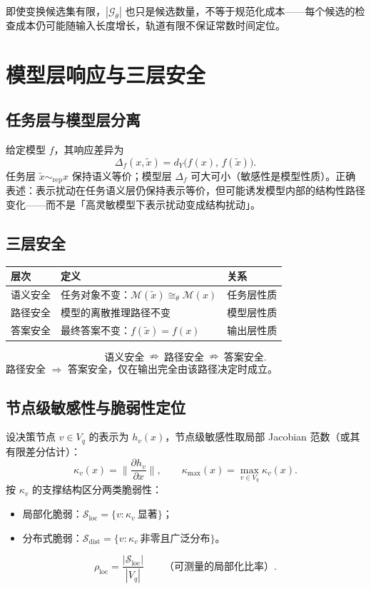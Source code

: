 \documentclass[11pt]{ctexart}
\begin{document}
即使变换候选集有限，$|\mathcal{G}_{\theta}|$ 也只是候选数量，不等于规范化成本——每个候选的检查成本仍可能随输入长度增长，轨道有限不保证常数时间定位。

\section{模型层响应与三层安全}

\subsection{任务层与模型层分离}

给定模型 $f$，其响应差异为
\[
  \Delta_f(x,\tilde{x}) = d_Y\!\big(f(x),\, f(\tilde{x})\big).
\]
任务层 $\tilde{x}\sim_{\mathrm{rep}}x$ 保持语义等价；模型层 $\Delta_f$ 可大可小（敏感性是模型性质）。正确表述：表示扰动在任务语义层仍保持表示等价，但可能诱发模型内部的结构性路径变化——而不是「高灵敏模型下表示扰动变成结构扰动」。

\subsection{三层安全}

\begin{center}
\begin{tabular}{p{2.6cm}p{8.6cm}p{3.2cm}}
\toprule
\textbf{层次} & \textbf{定义} & \textbf{关系} \\
\midrule
语义安全 & 任务对象不变：$\mathcal{M}(\tilde{x})\cong_{\theta}\mathcal{M}(x)$ & 任务层性质 \\
路径安全 & 模型的离散推理路径不变 & 模型层性质 \\
答案安全 & 最终答案不变：$f(\tilde{x})=f(x)$ & 输出层性质 \\
\bottomrule
\end{tabular}
\end{center}
\[
  \text{语义安全}\ \nRightarrow\ \text{路径安全}\ \nRightarrow\ \text{答案安全}.
\]
路径安全 $\Rightarrow$ 答案安全，仅在输出完全由该路径决定时成立。

\subsection{节点级敏感性与脆弱性定位}

设决策节点 $v\in V_q$ 的表示为 $h_v(x)$，节点级敏感性取局部 Jacobian 范数（或其有限差分估计）：
\[
  \kappa_v(x) = \Big\lVert \frac{\partial h_v}{\partial x} \Big\rVert,
  \qquad
  \kappa_{\max}(x) = \max_{v\in V_q}\kappa_v(x).
\]
按 $\kappa_v$ 的支撑结构区分两类脆弱性：
\begin{itemize}
  \item 局部化脆弱：$\mathcal{S}_{\mathrm{loc}} = \{v : \kappa_v\ \text{显著}\}$；
  \item 分布式脆弱：$\mathcal{S}_{\mathrm{dist}} = \{v : \kappa_v\ \text{非零且广泛分布}\}$。
\end{itemize}
\[
  \rho_{\mathrm{loc}} = \frac{|\mathcal{S}_{\mathrm{loc}}|}{|V_q|}
  \qquad\text{（可测量的局部化比率）}.
\]
\end{document}
